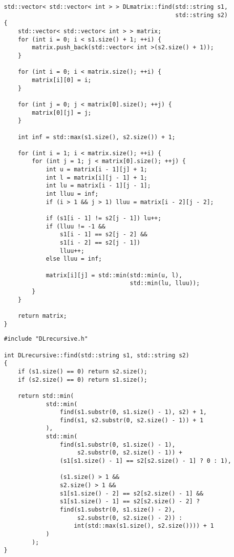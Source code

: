 ﻿\documentclass[a4paper,12pt]{article}
\begin{document}
    \begin{lstlisting}[caption=Расстояние Дамерау-Левенштейна матричный метод]
std::vector< std::vector< int > > DLmatrix::find(std::string s1,
                                                 std::string s2)
{
    std::vector< std::vector< int > > matrix;
    for (int i = 0; i < s1.size() + 1; ++i) {
        matrix.push_back(std::vector< int >(s2.size() + 1));
    }

    for (int i = 0; i < matrix.size(); ++i) {
        matrix[i][0] = i;
    }

    for (int j = 0; j < matrix[0].size(); ++j) {
        matrix[0][j] = j;
    }

    int inf = std::max(s1.size(), s2.size()) + 1;

    for (int i = 1; i < matrix.size(); ++i) {
        for (int j = 1; j < matrix[0].size(); ++j) {
            int u = matrix[i - 1][j] + 1;
            int l = matrix[i][j - 1] + 1;
            int lu = matrix[i - 1][j - 1];
            int lluu = inf;
            if (i > 1 && j > 1) lluu = matrix[i - 2][j - 2];

            if (s1[i - 1] != s2[j - 1]) lu++;
            if (lluu != -1 && 
                s1[i - 1] == s2[j - 2] && 
                s1[i - 2] == s2[j - 1]) 
                lluu++;
            else lluu = inf;

            matrix[i][j] = std::min(std::min(u, l), 
                                    std::min(lu, lluu));
        }
    }

    return matrix;
}
    \end{lstlisting}

    \begin{lstlisting}[caption=Расстояние Дамерау-Левенштейна рекурсивный метод]
#include "DLrecursive.h"

int DLrecursive::find(std::string s1, std::string s2)
{
    if (s1.size() == 0) return s2.size();
    if (s2.size() == 0) return s1.size();

    return std::min(
            std::min(
                find(s1.substr(0, s1.size() - 1), s2) + 1,
                find(s1, s2.substr(0, s2.size() - 1)) + 1
            ),
            std::min(
                find(s1.substr(0, s1.size() - 1), 
                     s2.substr(0, s2.size() - 1)) + 
                (s1[s1.size() - 1] == s2[s2.size() - 1] ? 0 : 1),

                (s1.size() > 1 && 
                s2.size() > 1 && 
                s1[s1.size() - 2] == s2[s2.size() - 1] && 
                s1[s1.size() - 1] == s2[s2.size() - 2] ?
                find(s1.substr(0, s1.size() - 2), 
                     s2.substr(0, s2.size() - 2)) : 
                    int(std::max(s1.size(), s2.size()))) + 1
            )
        );
}

    \end{lstlisting}
\end{document}
